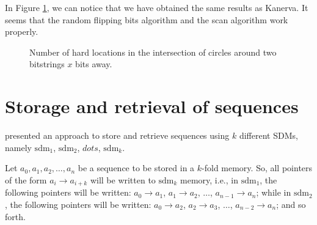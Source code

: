 In Figure \ref{fig:validation-intersection}, we can notice that we have obtained the same results as Kanerva. It seems that the random flipping bits algorithm and the scan algorithm work properly.

\begin{figure}[!htb]
  \centering

  \caption{Number of hard locations in the intersection of circles around two bitstrings $x$ bits away.}
  \label{fig:validation-intersection}
\end{figure}


\section{Storage and retrieval of sequences}

\citet[Ch.8]{Kanerva1988} presented an approach to store and retrieve sequences using $k$ different SDMs, namely $\text{sdm}_1$, $\text{sdm}_2$, $dots$, $\text{sdm}_k$.

Let $a_0, a_1, a_2, \dots, a_n$ be a sequence to be stored in a $k$-fold memory. So, all pointers of the form $a_i \rightarrow a_{i+k}$ will be written to $\text{sdm}_k$ memory, i.e., in $\text{sdm}_1$, the following pointers will be written: $a_0 \rightarrow a_1$, $a_1 \rightarrow a_2$, $\dots$, $a_{n-1} \rightarrow a_n$; while in $\text{sdm}_2$, the following pointers will be written: $a_0 \rightarrow a_2$, $a_2 \rightarrow a_3$, $\dots$, $a_{n-2} \rightarrow a_n$; and so forth.

